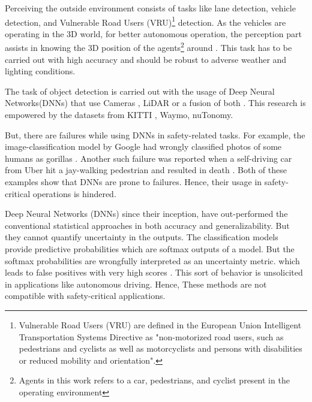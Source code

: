 \documentclass[10pt,twocolumn,letterpaper]{article}
\begin{document}
Perceiving the outside environment consists of tasks like lane detection, vehicle detection, and Vulnerable Road Users (VRU)\footnote{Vulnerable Road Users (VRU) are defined in the European Union Intelligent Transportation Systems Directive as "non-motorized road users, such as pedestrians and cyclists as well as motorcyclists and persons with disabilities or reduced mobility and orientation".} detection. As the vehicles are operating in the 3D world, for better autonomous operation, the perception part assists in knowing the 3D position of the agents\footnote{Agents in this work refers to a car, pedestrians, and cyclist present in the operating environment} around \cite{KITTI2012}. This task has to be carried out with high accuracy and should be robust to adverse weather and lighting conditions. 

The task of object detection is carried out with the usage of Deep Neural Networks(DNNs) \cite{Rao2018, Arnold2019} that use Cameras \cite{Chen2016, Mousavian2017, Chabot2017, Chen2017}, LiDAR \cite{VOTE3DEEP2017, Zhou2018, Sahba2019, Simon2018, Xiang2015} or a fusion of both \cite{Du2018, FPointnet2018, AVOD2018, FrustumConvnet2019}. This research is empowered by the datasets from KITTI \cite{KITTI2012}, Waymo\cite{Waymo2019}, nuTonomy\cite{Caesar2020}.

But, there are failures while using DNNs in safety-related tasks. For example, \label{GoogleFailure} the image-classification model by Google had wrongly classified photos of some humans as gorillas \cite{Mulshine2015}. Another such failure was reported\label{Uberfailure} when a self-driving car from Uber hit a jay-walking pedestrian and resulted in death \cite{SLJCW2018}. Both of these examples show that DNNs are prone to failures. Hence, their usage in safety-critical operations is hindered.

Deep Neural Networks (DNNs) since their inception, have out-performed the conventional statistical approaches in both accuracy and generalizability. But they cannot quantify uncertainty in the outputs. The classification models provide predictive probabilities which are softmax outputs of a model. But the softmax probabilities are wrongfully interpreted as an uncertainty metric. which leads to false positives with very high scores \cite{Blundell2015, Malinin2018}. This sort of behavior is unsolicited in applications like autonomous driving. Hence, These methods are not compatible with safety-critical applications. 
\end{document}
